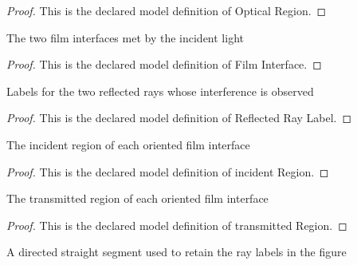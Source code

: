 \begin{proof}
  This is the declared model definition of Optical Region.
\end{proof}
\begin{definition}
  \label{def:physics:phyx-mini-0127:phyxminiproblems-problemphyxmini0127-filminterface}
  The two film interfaces met by the incident light
\end{definition}
\begin{proof}
  This is the declared model definition of Film Interface.
\end{proof}
\begin{definition}
  \label{def:physics:phyx-mini-0127:phyxminiproblems-problemphyxmini0127-reflectedraylabel}
  Labels for the two reflected rays whose interference is observed
\end{definition}
\begin{proof}
  This is the declared model definition of Reflected Ray Label.
\end{proof}
\begin{definition}
  \label{def:physics:phyx-mini-0127:phyxminiproblems-problemphyxmini0127-incidentregion}
  The incident region of each oriented film interface
\end{definition}
\begin{proof}
  This is the declared model definition of incident Region.
\end{proof}
\begin{definition}
  \label{def:physics:phyx-mini-0127:phyxminiproblems-problemphyxmini0127-transmittedregion}
  The transmitted region of each oriented film interface
\end{definition}
\begin{proof}
  This is the declared model definition of transmitted Region.
\end{proof}
\begin{definition}
  \label{def:physics:phyx-mini-0127:phyxminiproblems-problemphyxmini0127-raysegment}
  A directed straight segment used to retain the ray labels in the figure
\end{definition}
